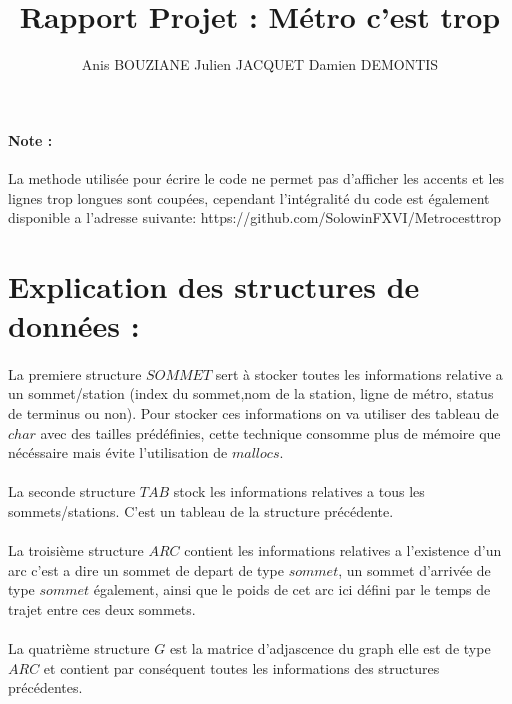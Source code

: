 \documentclass[a4paper]{article}
\title {Rapport Projet : Métro c'est trop}
\author{Anis BOUZIANE Julien JACQUET Damien DEMONTIS}
\begin{document}
  \maketitle
  \newpage

\paragraph{Note :}
La methode utilisée pour écrire le code ne permet pas d'afficher les accents et les lignes trop longues sont coupées, cependant l'intégralité du code est également disponible a l'adresse suivante:
https://github.com/SolowinFXVI/Metrocesttrop

\section{Explication des structures de données :}
  \paragraph{}
  La premiere structure $SOMMET$ sert à stocker toutes les informations relative a un sommet/station (index du sommet,nom de la station, ligne de métro, status de terminus ou non).
  Pour stocker ces informations on va utiliser des tableau de $char$ avec des tailles prédéfinies, cette technique consomme plus de mémoire que nécéssaire mais évite l'utilisation de $mallocs$.
  \paragraph{}
  La seconde structure $TAB$ stock les informations relatives a tous les sommets/stations. C'est un tableau de la structure précédente.
  \paragraph{}
  La troisième structure $ARC$ contient les informations relatives a l'existence d'un arc c'est a dire un sommet de depart de type $sommet$, un sommet d'arrivée de type $sommet$ également, ainsi que le poids de cet arc ici défini par le temps de trajet entre ces deux sommets.
  \paragraph{}
  La quatrième structure $G$ est la matrice d'adjascence du graph elle est de type $ARC$ et contient par conséquent toutes les informations des structures précédentes.
\end{document}
